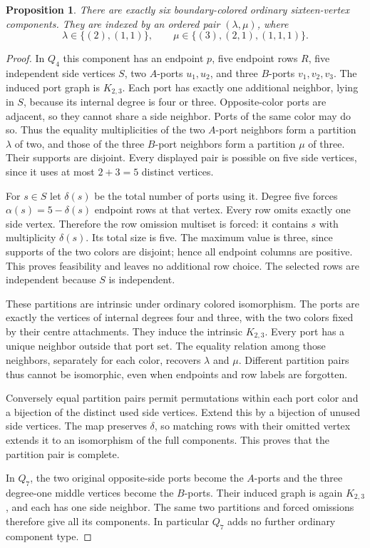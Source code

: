 \documentclass[11pt]{article}
\newtheorem{proposition}[theorem]{Proposition}
\begin{document}
\begin{proposition}\label{sixteen}
There are exactly six boundary-colored ordinary sixteen-vertex components.
They are indexed by an ordered pair $(\lambda,\mu)$, where
\[
 \lambda\in\{(2),(1,1)\},\qquad
 \mu\in\{(3),(2,1),(1,1,1)\}.
\]
\end{proposition}
\begin{proof}
In $Q_4$ this component has an endpoint $p$, five endpoint rows $R$,
five independent side vertices $S$, two $A$-ports $u_1,u_2$, and three
$B$-ports $v_1,v_2,v_3$. The induced port graph is $K_{2,3}$. Each
port has exactly one additional neighbor, lying in $S$, because its
internal degree is four or three. Opposite-color ports are adjacent,
so they cannot share a side neighbor. Ports of the same color may do
so. Thus the equality multiplicities of the two $A$-port neighbors
form a partition $\lambda$ of two, and those of the three $B$-port
neighbors form a partition $\mu$ of three. Their supports are disjoint.
Every displayed pair is possible on five side vertices, since it uses
at most $2+3=5$ distinct vertices.

For $s\in S$ let $\delta(s)$ be the total number of ports using it.
Degree five forces $\alpha(s)=5-\delta(s)$ endpoint rows at that
vertex. Every row omits exactly one side vertex. Therefore the row
omission multiset is forced: it contains $s$ with multiplicity
$\delta(s)$. Its total size is five. The maximum value is three,
since supports of the two colors are disjoint; hence all endpoint
columns are positive. This proves feasibility and leaves no additional
row choice. The selected rows are independent because $S$ is independent.

These partitions are intrinsic under ordinary colored isomorphism.
The ports are exactly the vertices of internal degrees four and three,
with the two colors fixed by their centre attachments. They induce the
intrinsic $K_{2,3}$. Every port has a unique neighbor outside that port
set. The equality relation among those neighbors, separately for each
color, recovers $\lambda$ and $\mu$. Different partition pairs thus
cannot be isomorphic, even when endpoints and row labels are forgotten.

Conversely equal partition pairs permit permutations within each port
color and a bijection of the distinct used side vertices. Extend this
by a bijection of unused side vertices. The map preserves $\delta$,
so matching rows with their omitted vertex extends it to an isomorphism
of the full components. This proves that the partition pair is complete.

In $Q_7$, the two original opposite-side ports become the $A$-ports
and the three degree-one middle vertices become the $B$-ports. Their
induced graph is again $K_{2,3}$, and each has one side neighbor.
The same two partitions and forced omissions therefore give all its
components. In particular $Q_7$ adds no further ordinary component type.
\end{proof}
\end{document}
